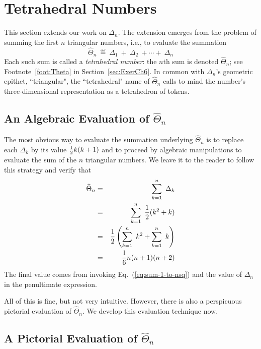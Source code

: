 \section{Tetrahedral Numbers}
\label{sec:tetraedralNumbers}

 

This section extends our work on $\Delta_n$.  The extension emerges from the problem of summing the first $n$ triangular numbers, i.e., to evaluate the summation
\[ \widehat{\Theta}_n \ \eqdef \ \Delta_1 \ + \ \Delta_2 \ + \cdots +\ \Delta_n \]
Each such sum is called a {\it tetrahedral number}: the  $n$th sum is denoted $\widehat{\Theta}_n$; see Footnote~\ref{foot:Theta} in Section~\ref{sec:ExerCh6}.  In common with $\Delta_n$'s geometric epithet, ``triangular", the ``tetrahedral" name of $\widehat{\Theta}_n$ calls to mind the number's three-dimensional representation as a tetrahedron of tokens. 

\subsection{An Algebraic Evaluation of $\widehat{\Theta}_n$}

The most obvious way to evaluate the summation underlying $\widehat{\Theta}_n$ is to replace each $\Delta_k$ by its value ${1 \over 2}k (k+1)$ and to proceed by algebraic manipulations to evaluate the sum of the $n$ triangular numbers.  We leave it to the reader to follow this strategy and verify that
\begin{eqnarray*}
\widehat{\Theta}_n & = & \sum_{k=1}^{n} \ \Delta_k \\
      & = & \sum_{k=1}^{n} \ \frac{1}{2} (k^2 + k) \\
      & =  & \frac{1}{2} \left( \sum_{k=1}^{n} \ k^2 + \sum_{k=1}^{n}  \ k \right) \\
      & = & {1 \over 6} n (n+1)(n+2)
\end{eqnarray*}
The final value comes from invoking Eq.~(\ref{eq:sum-1-to-nsq}) and the value of $\Delta_n$ in the penultimate expression. 

\smallskip

All of this is fine, but not very intuitive.  However, there is also a perspicuous pictorial evaluation of $\widehat{\Theta}_n$.  We develop this evaluation technique now.

\subsection{A Pictorial Evaluation of $\widehat{\Theta}_n$}


